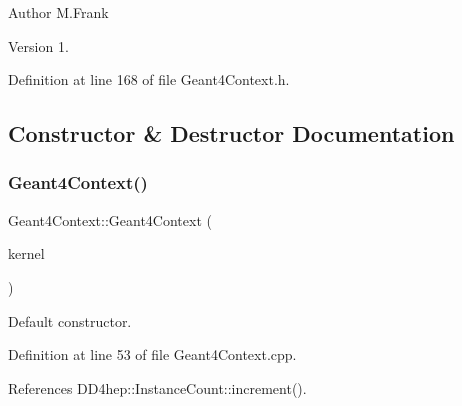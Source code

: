 \begin{DoxyAuthor}{Author}
M.\+Frank 
\end{DoxyAuthor}
\begin{DoxyVersion}{Version}
1. 
\end{DoxyVersion}


Definition at line 168 of file Geant4\+Context.\+h.



\subsection{Constructor \& Destructor Documentation}
\hypertarget{class_d_d4hep_1_1_simulation_1_1_geant4_context_a95592e635ace3345c980cb855cd370a6}{}\label{class_d_d4hep_1_1_simulation_1_1_geant4_context_a95592e635ace3345c980cb855cd370a6} 
\subsubsection{\texorpdfstring{Geant4\+Context()}{Geant4Context()}}
{\footnotesize\ttfamily Geant4\+Context\+::\+Geant4\+Context (\begin{DoxyParamCaption}\item[{\hyperlink{class_d_d4hep_1_1_simulation_1_1_geant4_kernel}{Geant4\+Kernel} $\ast$}]{kernel }\end{DoxyParamCaption})\hspace{0.3cm}{\ttfamily [protected]}}



Default constructor. 



Definition at line 53 of file Geant4\+Context.\+cpp.



References D\+D4hep\+::\+Instance\+Count\+::increment().

\hypertarget{class_d_d4hep_1_1_simulation_1_1_geant4_context_a2749e0729fa01575c3bac14918cca3c8}{}\label{class_d_d4hep_1_1_simulation_1_1_geant4_context_a2749e0729fa01575c3bac14918cca3c8} 
